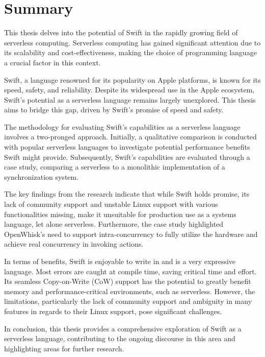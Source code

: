 \chapter*{Summary}

This thesis delves into the potential of Swift in the rapidly growing field of serverless computing. Serverless computing has gained significant attention due to its scalability and cost-effectiveness, making the choice of programming language a crucial factor in this context.

Swift, a language renowned for its popularity on Apple platforms, is known for its speed, safety, and reliability. Despite its widespread use in the Apple ecosystem, Swift's potential as a serverless language remains largely unexplored. This thesis aims to bridge this gap, driven by Swift's promise of speed and safety.

The methodology for evaluating Swift's capabilities as a serverless language involves a two-pronged approach. Initially, a qualitative comparison is conducted with popular serverless languages to investigate potential performance benefits Swift might provide. Subsequently, Swift's capabilities are evaluated through a case study, comparing a serverless to a monolithic implementation of a synchronization system.

The key findings from the research indicate that while Swift holds promise, its lack of community support and unstable Linux support with various functionalities missing, make it unsuitable for production use as a systems language, let alone serverless. Furthermore, the case study highlighted OpenWhisk's need to support intra-concurrency to fully utilize the hardware and achieve real concurrency in invoking actions.

In terms of benefits, Swift is enjoyable to write in and is a very expressive language. Most errors are caught at compile time, saving critical time and effort. Its seamless Copy-on-Write (CoW) support has the potential to greatly benefit memory and performance-critical environments, such as serverless. However, the limitations, particularly the lack of community support and ambiguity in many features in regards to their Linux support, pose significant challenges.

In conclusion, this thesis provides a comprehensive exploration of Swift as a serverless language, contributing to the ongoing discourse in this area and highlighting areas for further research.

